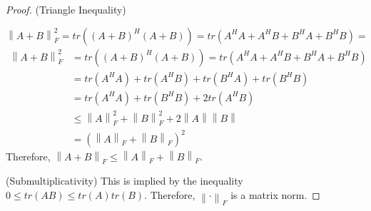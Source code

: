 \documentclass[letterpaper,12pt]{article}
\theoremstyle{definition}
\newcommand{\norm}[1]{\left\lVert#1\right\rVert}
\begin{document}
\begin{proof}
	(Triangle Inequality) 
	
	\begin{equation}
	\norm{A+ B}^2_F = tr((A + B)^H(A + B)) = tr(A^HA + A^HB + B^HA + B^HB) = 
	\end{equation}
	\begin{align*}
	\norm{A+ B}^2_F &= tr((A + B)^H(A + B)) = tr(A^HA + A^HB + B^HA + B^HB) \\
	&= tr(A^HA) + tr(A^HB) + tr(B^HA) + tr(B^HB) \\
	&= tr(A^HA)  + tr(B^HB) + 2 tr(A^HB) \\
	&\leq \norm{A}^2_F +  \norm{B}^2_F + 2\norm{A}\norm{B} \tag{by Cauchy-Schwarz} \\
	&= (\norm{A}_F +  \norm{B}_F)^2
	\end{align*}
	Therefore, $\norm{A+ B}_F \leq \norm{A}_F +  \norm{B}_F$.
	
	(Submultiplicativity) This is implied by the inequality $0 \leq tr(AB) \leq tr(A)tr(B)$. Therefore,  $\norm{\cdot}_F$ is a matrix norm.
\end{proof}
\end{document}
